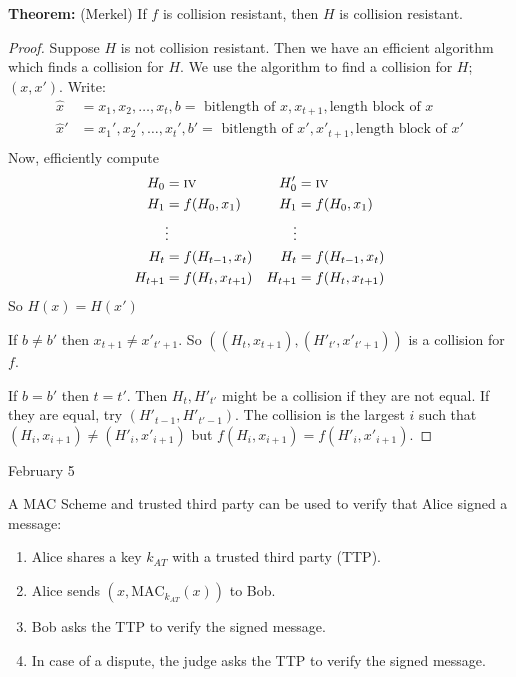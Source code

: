 \documentclass[a4paper,12pt]{article}
\begin{document}
{\bf Theorem:} (Merkel) If $f$ is collision resistant, then $H$ is collision resistant.

\begin{proof}
Suppose $H$ is not collision resistant.  Then we have an efficient algorithm which finds a collision for $H$.  We use the algorithm to find a collision for $H$; $(x,x')$.  Write:
\begin{align*}
\hat x &= x_1, x_2, \ldots, x_t, b = \text{ bitlength of }x, x_{t+1}, \text{length block of }x\\
\hat x' &= x_1', x_2', \ldots, x_t', b' = \text{ bitlength of }x', x'_{t+1}, \text{length block of }x'\\
\end{align*}
Now, efficiently compute
\begin{align*}
H_0 &= \text{\sc iv} & H_0'&= \text{\sc iv}\\
H_1 &= f(H_0,x_1) & H_1 &= f(H_0,x_1)\\
&\vdots&\vdots&\\
H_t &= f(H_{t-1},x_t)&H_t &= f(H_{t-1},x_t)\\
H_{t+1} &= f(H_t,x_{t+1})&H_{t+1} &= f(H_t,x_{t+1})\\
\end{align*}
So $H(x) = H(x')$

If $b\ne b'$ then $x_{t+1}\ne x'_{t'+1}$.  So $((H_t,x_{t+1}),(H'_{t'},x'_{t'+1}))$
is a collision for $f$.

If $b=b'$ then $t=t'$.  Then $H_t,H'_{t'}$ might be a collision if they are not equal.  If they are equal, try $(H'_{t-1},H'_{t'-1})$.  The collision is the largest $i$ such that
$(H_i,x_{i+1})\ne (H'_i,x'_{i+1})$ but $f(H_i,x_{i+1})=f(H'_i,x'_{i+1})$.
\end{proof}
\clearpage

 \hfill February 5

A MAC Scheme and trusted third party can be used to verify that Alice signed a message:
\begin{enumerate}
\item Alice shares a key $k_{AT}$ with a trusted third party (TTP).
\item Alice sends $(x, \text{MAC}_{k_{AT}}(x))$ to Bob.
\item Bob asks the TTP to verify the signed message.
\item In case of a dispute, the judge asks the TTP to verify the signed message.
\end{enumerate}
\end{document}
